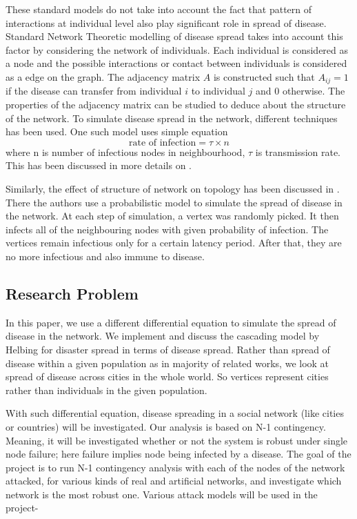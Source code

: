 \documentclass[11pt]{article}
\begin{document}
These standard models do not take into account the fact that pattern of interactions at individual level also play significant role in spread of disease. Standard Network Theoretic modelling of disease spread takes into account this factor by considering the network of individuals. Each individual is considered as a node and the possible interactions or contact between individuals is considered as a edge on the graph. The adjacency matrix $A$ is constructed such that $A_{ij} = 1$ if the disease can transfer from individual $i$ to individual $j$ and $0$ otherwise. The properties of the adjacency matrix can be studied to deduce about the structure of the network. To simulate disease spread in the network, different techniques has been used. One such model uses simple equation
\[ \text {rate of infection} = \tau \times n \] where n is number of infectious nodes in neighbourhood, $\tau$ is transmission rate. This has been discussed in more details on \cite{keeling}.

Similarly, the effect of structure of network on topology has been discussed in \cite{shirley}. There the authors use a probabilistic model to simulate the spread of disease in the network. At each step of simulation, a vertex was randomly picked. It then infects all of the neighbouring nodes with given probability of infection. The vertices remain infectious only for a certain latency period. After that, they are no more infectious and also immune to disease.

\subsection{Research Problem}
In this paper, we use a different differential equation to simulate the spread of disease in the network. We implement and discuss the cascading model by Helbing for disaster spread in terms of disease spread. Rather than spread of disease within a given population as in majority of related works, we look at spread of disease across cities in the whole world. So vertices represent cities rather than individuals in the given population.

With such differential equation, disease spreading in a social network (like cities or countries) will be investigated.  Our analysis is based on N-1 contingency. Meaning, it will be investigated whether or not the system is robust under single node failure; here failure implies node being infected by a disease. The goal of the project is to run N-1 contingency analysis with each of the nodes of the network attacked, for various kinds of real and artificial networks, and investigate which network is the most robust one. Various attack models will be used in the project- 
\end{document}
